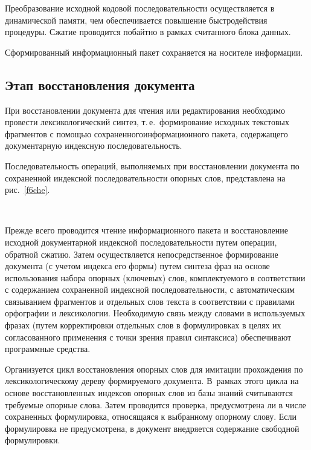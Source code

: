 \begin{multicols}{2}
     Преобразование исходной кодовой последовательности осуществляется в 
динамической памяти, чем обеспечивается повышение быстродействия 
процедуры. Сжатие проводится побайтно в рамках считанного блока данных.
     
     Сформированный информационный пакет сохраняется на носителе 
информации.
     
     \subsection*{Этап восстановления документа}
     
     При восстановлении документа для чтения или редактирования 
необходимо провести лексикологический синтез, т.\,е.\ формирование 
исходных текстовых фрагментов с помощью сохраненного\linebreak информационного 
пакета, содержащего документарную индексную последовательность.
     
     Последовательность операций, выполняемых при восстановлении 
документа по сохраненной индексной последовательности опорных слов, 
представлена на рис.~\ref{f6che}.

\begin{figure*} %
\vspace*{1pt}
\begin{center}
\mbox{%
\epsfxsize=164.45mm
}
\end{center}
\vspace*{-9pt}
\end{figure*}

     Прежде всего проводится чтение информационного пакета и 
восстановление исходной документарной индексной последовательности путем 
операции, обратной сжатию. Затем осуществляется непосредственное 
формирование документа (с учетом индекса его формы) путем синтеза фраз на 
основе использования набора опорных (ключевых) слов, комплектуемого в 
соответствии с содержанием сохраненной индексной последовательности, с 
автоматическим связыванием фрагментов и отдельных слов текста в 
соответствии с правилами орфографии и лексикологии. Необходимую связь 
между словами в используемых фразах (путем корректировки отдельных слов в 
формулировках в целях их согласованного применения с точки зрения правил 
синтаксиса) обеспечивают программные средства.
     
     Организуется цикл восстановления опорных слов для имитации 
прохождения по лексикологическому дереву формируемого документа. 
В~рамках этого цикла на основе восстановленных индек\-сов опорных слов 
из базы знаний считываются тре\-буемые опорные слова. Затем проводится 
проверка, предусмотрена ли в числе сохраненных формулировка, 
относящаяся к выбранному опорному слову. Если формулировка не 
предусмотрена, в документ внедряется содержание свободной форму\-ли\-ровки. 
{

}
\end{multicols}
